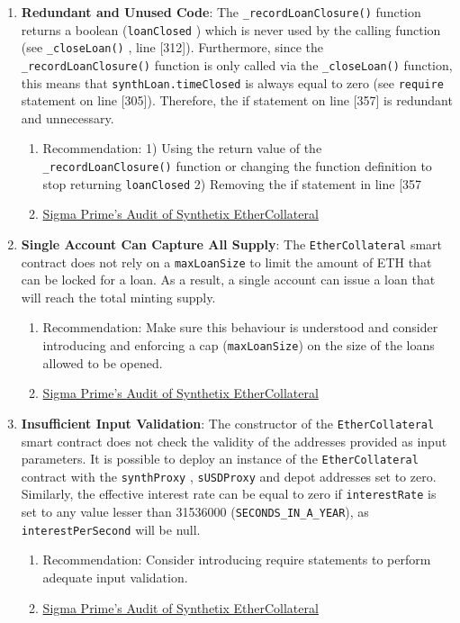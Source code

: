 \begin{enumerate}
\item\textbf{Redundant and Unused Code}: The \verb|_recordLoanClosure()| function returns a boolean (\verb|loanClosed| ) which is never used by the calling function (see \verb|_closeLoan()| , line [312]). Furthermore, since the \verb|_recordLoanClosure()| function is only called via the \verb|_closeLoan()| function, this means that \verb|synthLoan.timeClosed| is always equal to zero (see \verb|require| statement on line [305]). Therefore, the if statement on line [357] is redundant and unnecessary.
	\begin{enumerate}
	\item Recommendation: 1) Using the return value of the \verb|_recordLoanClosure()| function or changing the function definition to stop returning \verb|loanClosed| 2) Removing the if statement in line [357
	\item\href{https://github.com/sigp/public-audits/blob/master/synthetix/ethercollateral/review.pdf}{Sigma Prime's Audit of Synthetix EtherCollateral}
	\end{enumerate}

\item\textbf{Single Account Can Capture All Supply}: The \verb|EtherCollateral| smart contract does not rely on a \verb|maxLoanSize| to limit the amount of ETH that can be locked for a loan. As a result, a single account can issue a loan that will reach the total minting supply.
	\begin{enumerate}
	\item Recommendation: Make sure this behaviour is understood and consider introducing and enforcing a cap (\verb|maxLoanSize|) on the size of the loans allowed to be opened.
	\item\href{https://github.com/sigp/public-audits/blob/master/synthetix/ethercollateral/review.pdf}{Sigma Prime's Audit of Synthetix EtherCollateral}
	\end{enumerate}

\item\textbf{Insufficient Input Validation}: The constructor of the \verb|EtherCollateral| smart contract does not check the validity of the addresses provided as input parameters. It is possible to deploy an instance of the \verb|EtherCollateral| contract with the \verb|synthProxy| , \verb|sUSDProxy| and depot addresses set to zero. Similarly, the effective interest rate can be equal to zero if \verb|interestRate| is set to any value lesser than 31536000 (\verb|SECONDS_IN_A_YEAR|), as \verb|interestPerSecond| will be null.
	\begin{enumerate}
	\item Recommendation: Consider introducing require statements to perform adequate input validation.
	\item\href{https://github.com/sigp/public-audits/blob/master/synthetix/ethercollateral/review.pdf}{Sigma Prime's Audit of Synthetix EtherCollateral}
	\end{enumerate}


\end{enumerate}
